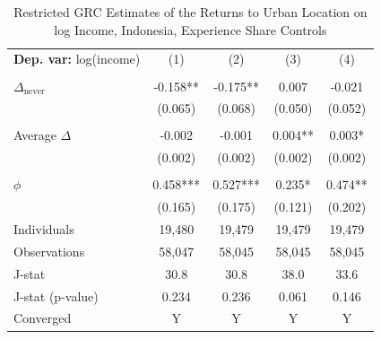 \begin{table}[htbp] \centering \begin{threeparttable}
 \caption{Restricted GRC Estimates of the Returns to Urban Location on log Income, Indonesia, Experience Share Controls} 
 \label{tab:GRC_IDN_income_urban_unb_exp_sh} 
\begin{tabular}{l cccc} \toprule  \textbf{Dep. var:}  log(income) 
                    &\multicolumn{1}{c}{(1)}   &\multicolumn{1}{c}{(2)}   &\multicolumn{1}{c}{(3)}   &\multicolumn{1}{c}{(4)}   \\
                    &               &               &               &               \\
\addlinespace
$\Delta_{\text{never}}$&      -0.158** &      -0.175** &       0.007   &      -0.021   \\
                    &     (0.065)   &     (0.068)   &     (0.050)   &     (0.052)   \\
                    &               &               &               &               \\
\addlinespace
Average $\Delta$    &      -0.002   &      -0.001   &       0.004** &       0.003*  \\
                    &     (0.002)   &     (0.002)   &     (0.002)   &     (0.002)   \\
                    &               &               &               &               \\
\addlinespace
$\phi$              &       0.458***&       0.527***&       0.235*  &       0.474** \\
                    &     (0.165)   &     (0.175)   &     (0.121)   &     (0.202)   \\
\addlinespace
Individuals         &      19,480   &      19,479   &      19,479   &      19,479   \\
Observations        &      58,047   &      58,045   &      58,045   &      58,045   \\
J-stat              &        30.8   &        30.8   &        38.0   &        33.6   \\
J-stat (p-value)    &       0.234   &       0.236   &       0.061   &       0.146   \\
Converged           &           Y   &           Y   &           Y   &           Y   \\

\end{tabular}
\end{threeparttable}
\end{table}
